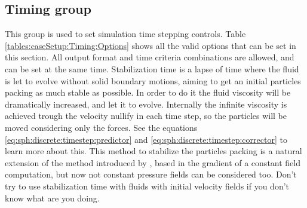 \subsection{Timing group}
\label{sss:XML:Timing}
%
This group is used to set simulation time stepping controls. Table
\ref{tables:caseSetup:Timing:Options} shows all the valid options
that can be set in this section.\rc
%
All output format and time criteria combinations are allowed, and
can be set at the same time.\rc
%
Stabilization time is a lapse of time where the fluid is let to
evolve without solid boundary motions, aiming to get an initial
particles packing as much stable as possible. In order to do it
the fluid viscosity will be dramatically increased, and let it
to evolve.\rc
%
Internally the infinite viscosity is achieved trough
the velocity nullify in each time step, so the particles will be
moved considering only the forces. See the equations
\ref{eq:sph:discrete:timestep:predictor} and
\ref{eq:sph:discrete:timestep:corrector} to learn more about
this.\rc
%
This method to stabilize the particles packing is a natural
extension of the method introduced by \citet{Colagrossi_CPC_2012},
based in the gradient of a constant field computation, but now
not constant pressure fields can be considered too.\rc
%
Don't try to use stabilization time with fluids with initial
velocity fields if you don't know what are you doing.
%
